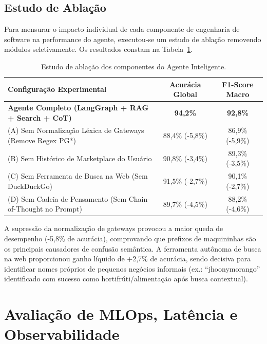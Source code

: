\documentclass[
	12pt,				
	openright,			
	oneside,			
	a4paper,			
	english,			
	brazil				
	]{abntex2}
\begin{document}
\subsection{Estudo de Ablação}
Para mensurar o impacto individual de cada componente de engenharia de software na performance do agente, executou-se um estudo de ablação removendo módulos seletivamente. Os resultados constam na Tabela~\ref{tab:ablacao}.

\begin{table}[htb]
    \centering
    \caption{Estudo de ablação dos componentes do Agente Inteligente.}
    \label{tab:ablacao}
    \begin{tabular}{lcc}
        \toprule
        \textbf{Configuração Experimental} & \textbf{Acurácia Global} & \textbf{F1-Score Macro} \\
        \midrule
        \textbf{Agente Completo (LangGraph + RAG + Search + CoT)} & \textbf{94,2\%} & \textbf{92,8\%} \\
        (A) Sem Normalização Léxica de Gateways (Remove Regex PG*) & 88,4\% (-5,8\%) & 86,9\% (-5,9\%) \\
        (B) Sem Histórico de Marketplace do Usuário & 90,8\% (-3,4\%) & 89,3\% (-3,5\%) \\
        (C) Sem Ferramenta de Busca na Web (Sem DuckDuckGo) & 91,5\% (-2,7\%) & 90,1\% (-2,7\%) \\
        (D) Sem Cadeia de Pensamento (Sem Chain-of-Thought no Prompt) & 89,7\% (-4,5\%) & 88,2\% (-4,6\%) \\
        \bottomrule
    \end{tabular}
\end{table}

A supressão da normalização de gateways provocou a maior queda de desempenho (-5,8\% de acurácia), comprovando que prefixos de maquininhas são os principais causadores de confusão semântica. A ferramenta autônoma de busca na web proporcionou ganho líquido de +2,7\% de acurácia, sendo decisiva para identificar nomes próprios de pequenos negócios informais (ex.: ``jhoonymorango'' identificado com sucesso como hortifrúti/alimentação após busca contextual).

\section{Avaliação de MLOps, Latência e Observabilidade}
\label{sec:val_mlops}
\end{document}
